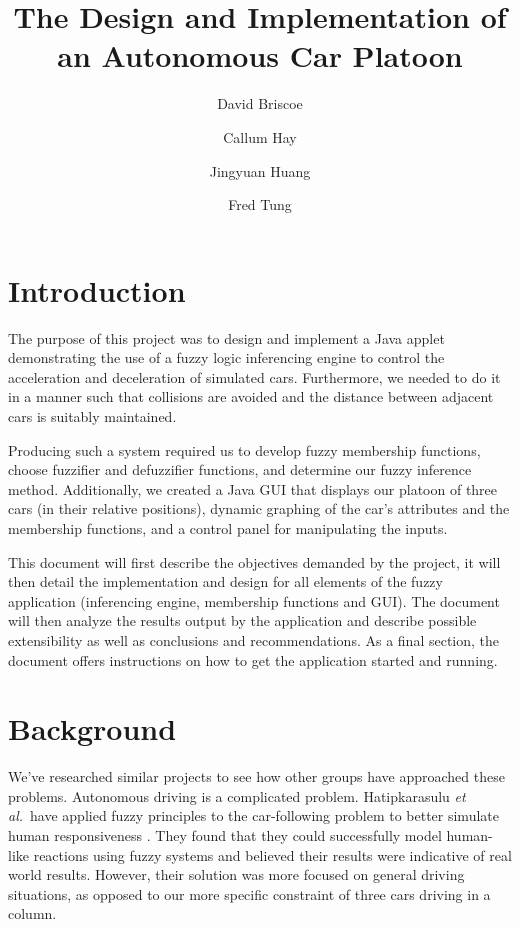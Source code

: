 \documentclass[12pt,letterpaper,oneside]{report}
\title{The Design and Implementation of\\an Autonomous Car Platoon}
\author{ David Briscoe \and Callum Hay \and Jingyuan Huang \and Fred Tung }
\newcommand \etal{\textit{et al.}}
\begin{document}
\setcounter{page}{1}
\maketitle
\tableofcontents
\newpage

\setcounter{section}{0}
\setcounter{page}{1}


\section{Introduction}
The purpose of this project was to
design and implement a Java applet demonstrating the use of a fuzzy logic
inferencing engine to control the acceleration and deceleration of simulated
cars. Furthermore, we needed to do it in a manner such that collisions are
avoided and the distance between adjacent cars is suitably maintained.

Producing such a system required us to develop fuzzy membership functions,
choose fuzzifier and defuzzifier functions, and determine our fuzzy inference
method. Additionally, we created a Java GUI that displays our platoon of three
cars (in their relative positions), dynamic graphing of the car's attributes
and the membership functions, and a control panel for manipulating the inputs.

This document will first describe the objectives demanded by the project, it
will then detail the implementation and design for all elements of the
fuzzy application (inferencing engine, membership functions and GUI). The
document will then analyze the results output by the application and describe
possible extensibility as well as conclusions and recommendations.
As a final section, the document offers instructions on how to get the
application started and running.

\clearpage
\section{Background}
We've researched similar projects to see how other groups have approached these
problems. Autonomous driving is a complicated problem. Hatipkarasulu \etal~have
applied fuzzy principles to the car-following problem to better simulate human
responsiveness \cite{Hatipkarasulu}. They found that they could successfully
model human-like reactions using fuzzy systems and believed their results were
indicative of real world results. However, their solution was more focused on
general driving situations, as opposed to our more specific constraint of three
cars driving in a column.
\end{document}
